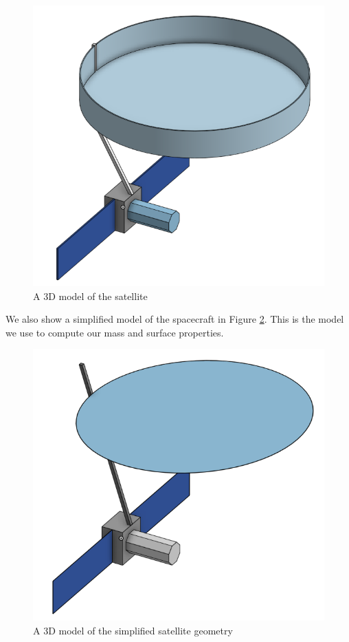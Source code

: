 \begin{figure}[H]
\centering
\includegraphics[scale=0.4]{Images/ps1_complex_model.png}
\caption{A 3D model of the satellite}
\label{fig:complex_model}
\end{figure}


We also show a simplified model of the spacecraft in Figure \ref{fig:simple_model}. This is the model we use to compute our mass and surface properties.

\begin{figure}[H]
\centering
\includegraphics[scale=0.4]{Images/ps1_simple_model.png}
\caption{A 3D model of the simplified satellite geometry}
\label{fig:simple_model}
\end{figure}

